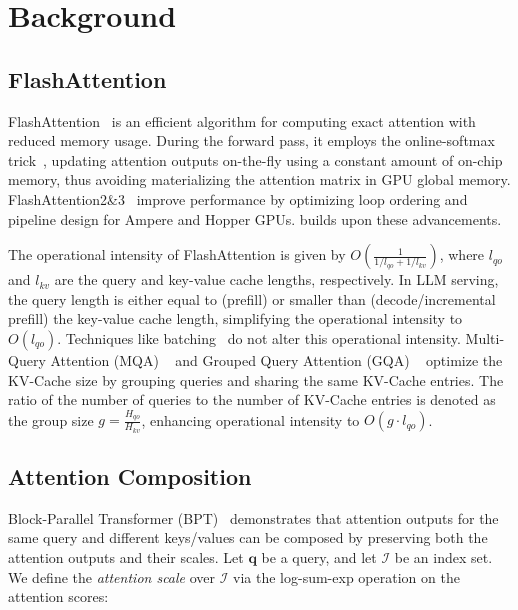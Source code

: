 \section{Background}
\label{sec:background}

\subsection{FlashAttention}
\label{sec:flashattention}

FlashAttention~\cite{dao2022flashattention} is an efficient algorithm for computing exact attention with reduced memory usage. During the forward pass, it employs the online-softmax trick~\cite{milakov2018onlinesoftmax}, updating attention outputs on-the-fly using a constant amount of on-chip memory, thus avoiding materializing the attention matrix in GPU global memory. FlashAttention2\&3~\cite{dao2023flashattention2,jay2024flashattention3} improve performance by optimizing loop ordering and pipeline design for Ampere and Hopper GPUs. \sys builds upon these advancements.

The operational intensity of FlashAttention is given by $O\left(\frac{1}{1/l_{qo} + 1/l_{kv}}\right)$, where $l_{qo}$ and $l_{kv}$ are the query and key-value cache lengths, respectively. In LLM serving, the query length is either equal to (prefill) or smaller than (decode/incremental prefill) the key-value cache length, simplifying the operational intensity to $O(l_{qo})$. Techniques like batching~\cite{yu2022orca} do not alter this operational intensity.
Multi-Query Attention (MQA) ~\cite{shazeer2019mqa} and Grouped Query Attention (GQA) ~\cite{ainslie2023gqa} optimize the KV-Cache size by grouping queries and sharing the same KV-Cache entries. The ratio of the number of queries to the number of KV-Cache entries is denoted as the group size $g = \frac{H_{qo}}{H_{kv}}$, enhancing operational intensity to $O(g \cdot l_{qo})$.

\subsection{Attention Composition}
\label{sec:attention-composition}

Block-Parallel Transformer (BPT)~\cite{liu2023blockparalleltransformer} demonstrates that attention outputs for the same query and different keys/values can be composed by preserving both the attention outputs and their scales. Let \(\mathbf{q}\) be a query, and let \(\mathcal{I}\) be an index set. We define the \emph{attention scale} over \(\mathcal{I}\) via the log-sum-exp operation on the attention scores:

